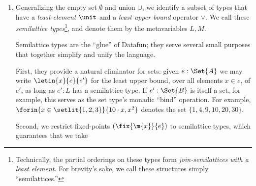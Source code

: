 \begin{enumerate}
\item\label{item:semilattice-types} Generalizing the empty set $\emptyset$ and
  union $\cup$, we identify a subset of types that have a \emph{least element}
  $\unit$ and a \emph{least upper bound} operator $\vee$. We call these
  \emph{semilattice types}\footnote{Technically, the partial orderings on these
    types form \emph{join-semilattices with a least element}. For brevity's
    sake, we call these structures simply ``semilattices.''}, and denote them by
  the metavariables $L,M$.

  Semilattice types are the ``glue'' of Datafun; they serve several small
  purposes that together simplify and unify the language.

  First, they provide a natural eliminator for sets: given $e : \Set{A}$ we may
  write $\letin{x}{e}{e'}$ for the least upper bound, over all elements $x \in
  e$, of $e'$, as long as $e' : L$ has a semilattice type. If $e' : \Set{B}$ is
  itself a set, for example, this serves as the set type's monadic ``bind''
  operation. For example, $\forin{x \in \setlit{1,2,3}} \{10 \cdot x, x^2\}$
  denotes the set $\{1, 4, 9, 10, 20, 30\}$. 

  Second, we restrict fixed-points $(\fix{\m{x}}{e})$ to semilattice types,
  which guarantees that we take



\end{enumerate}
